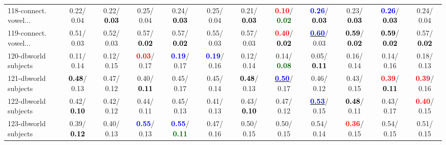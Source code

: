\begin{table}[h]
\begin{center}
{\begin{tabular}{lc|c|c|c|c|c|c|c|c|c|c}
118-connect. vowel... &   0.22/  0.04 &   0.22/\textcolor{black}{\textbf{  0.03}} &   0.25/  0.04 &   0.24/\textcolor{black}{\textbf{  0.03}} &   0.25/  0.04 &   0.21/\textcolor{black}{\textbf{  0.03}} & \textcolor{red}{\textbf{  0.10}}/\textcolor{darkgreen}{\textbf{  0.02}} & \textcolor{blue}{\textbf{  0.26}}/\textcolor{black}{\textbf{  0.03}} &   0.23/\textcolor{black}{\textbf{  0.03}} & \textcolor{blue}{\textbf{  0.26}}/\textcolor{black}{\textbf{  0.03}} &   0.24/  0.04 \\
119-connect. vowel... &   0.51/  0.03 &   0.52/  0.03 &   0.57/\textcolor{black}{\textbf{  0.02}} &   0.57/\textcolor{black}{\textbf{  0.02}} &   0.55/  0.03 &   0.57/  0.03 & \textcolor{red}{\textbf{  0.40}}/\textcolor{black}{\textbf{  0.02}} & \underline{\textcolor{blue}{\textbf{  0.60}}}/  0.03 & \textcolor{black}{\textbf{  0.59}}/\textcolor{black}{\textbf{  0.02}} & \textcolor{black}{\textbf{  0.59}}/\textcolor{black}{\textbf{  0.02}} &   0.57/\textcolor{black}{\textbf{  0.02}} \\
120-dbworld subjects &   0.11/  0.14 &   0.12/  0.15 & \textcolor{red}{\textbf{  0.03}}/  0.17 & \textcolor{blue}{\textbf{  0.19}}/  0.17 & \textcolor{blue}{\textbf{  0.19}}/  0.16 &   0.12/  0.14 &   0.14/\textcolor{darkgreen}{\textbf{  0.08}} &   0.05/\textcolor{black}{\textbf{  0.11}} &   0.16/  0.14 &   0.14/  0.16 &   0.18/  0.13 \\
121-dbworld subjects & \textcolor{black}{\textbf{  0.48}}/  0.13 &   0.47/  0.12 &   0.40/\textcolor{black}{\textbf{  0.11}} &   0.45/  0.17 &   0.45/  0.14 & \textcolor{black}{\textbf{  0.48}}/  0.13 & \underline{\textcolor{blue}{\textbf{  0.50}}}/  0.17 &   0.46/  0.12 &   0.43/  0.15 & \textcolor{red}{\textbf{  0.39}}/\textcolor{black}{\textbf{  0.11}} & \textcolor{red}{\textbf{  0.39}}/  0.16 \\
122-dbworld subjects &   0.42/\textcolor{black}{\textbf{  0.10}} &   0.42/  0.12 &   0.44/  0.11 &   0.45/  0.13 &   0.41/  0.13 &   0.43/\textcolor{black}{\textbf{  0.10}} &   0.47/  0.12 & \underline{\textcolor{blue}{\textbf{  0.53}}}/  0.15 & \textcolor{black}{\textbf{  0.48}}/  0.11 &   0.43/  0.17 & \textcolor{red}{\textbf{  0.40}}/  0.15 \\
123-dbworld subjects &   0.39/\textcolor{black}{\textbf{  0.12}} &   0.40/  0.13 & \textcolor{blue}{\textbf{  0.55}}/  0.13 & \textcolor{blue}{\textbf{  0.55}}/\textcolor{darkgreen}{\textbf{  0.11}} &   0.47/  0.16 &   0.50/  0.15 &   0.50/  0.15 &   0.54/  0.14 & \textcolor{red}{\textbf{  0.36}}/  0.15 &   0.54/  0.15 &   0.51/  0.15 \\

\end{tabular}}
\end{center}
\end{table}
